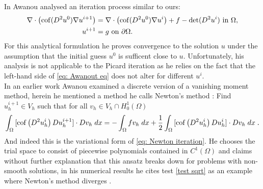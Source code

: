 In \cite{Awanou2014} Awanou analysed an iteration process similar to ours:
\begin{align}
	\nabla \cdot \left( \operatorname{cof}(D^2 u^0) \nabla u^{i+1} \right) &= \nabla \cdot \left( \operatorname{cof}(D^2 u^0) \nabla u^{i} \right) + f - \operatorname{det} (D^2u^i) \textnormal{ in } \Omega,  \label{eq: Awanout eq}\\
	u^{i+1} &= g \textnormal{ on } \partial \Omega.
\end{align}
For this analytical formulation he proves convergence to the \MA solution $u$ under the assumption that the initial guess $u^0$ is sufficent close to $u$. Unfortunately, his analysis is not applicable to the Picard iteration as he relies on the fact that the left-hand side of \eqref{eq: Awanout eq} does not alter for different $u^i$.\\
In an earlier work \cite{Awanou2010} Awanou examined a discrete version of a vanishing moment method, herein he mentioned a method he calls Newton's method \cite[(1.3)]{Awanou2010}: Find $u_h^{i+1}\in V_h$ such that for all $v_h \in V_h \cap H^1_0 (\Omega)$
\[
	\int_{\Omega} {{[\operatorname{cof} \left(  D^2 u_h^i \right) Du_h^{i+1}] \cdot Dv_h}\;dx} 
	= -	\int_{\Omega} {{f v_h}\;dx} 
		+ \frac 1 2 \int_{\Omega} {{[\operatorname{cof} \left(  D^2 u_h^i \right) Du_h^{i}] \cdot Dv_h}\;dx} \;  \label{eq: Awanout eq2}.
\]
And indeed this is the variational form of \eqref{eq: Newton iteration}.
He chooses the trial space to consist of piecewise polynomials contained in $C^1(\Omega)$ and claims without further explanation that this ansatz breaks down for problems with non-smooth solutions\cite[Introduction]{Awanou2010}, in his numerical results he cites test \ref{test sqrt} as an example where Newton's method diverges \cite[Section 4.4]{Awanou2010}.

